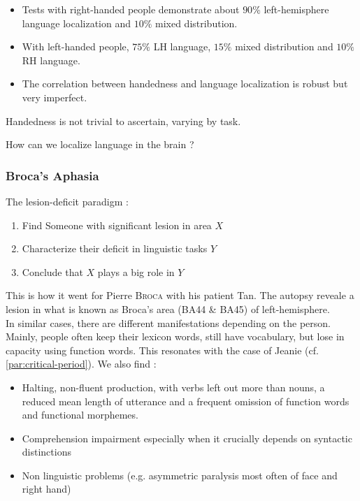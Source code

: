 \documentclass{cours}
\begin{document}
\begin{itemize}
    \item Tests with right-handed people demonstrate about $90\%$ left-hemisphere language localization and $10\%$ mixed distribution.
    \item With left-handed people, $75\%$ LH language, $15\%$ mixed distribution and $10\%$ RH language.
    \item The correlation between handedness and language localization is robust but very imperfect.
\end{itemize}
Handedness is not trivial to ascertain, varying by task.

How can we localize language in the brain ?

\subsubsection{Broca's Aphasia}
The lesion-deficit paradigm :
\begin{enumerate}
    \item Find Someone with significant lesion in area $X$
    \item Characterize their deficit in linguistic tasks $Y$
    \item Conclude that $X$ plays a big role in $Y$
\end{enumerate}
This is how it went for Pierre \textsc{Broca} with his patient Tan. The autopsy reveale a lesion in what is known as Broca's area (BA44 \& BA45) of left-hemisphere.\\
In similar cases, there are different manifestations depending on the person. Mainly, people often keep their lexicon words, still have vocabulary, but lose in capacity using function words. This resonates with the case of Jeanie (cf. \ref{par:critical-period}). We also find :
\begin{itemize}
    \item Halting, non-fluent production, with verbs left out more than nouns, a reduced mean length of utterance and a frequent omission of function words and functional morphemes.
    \item Comprehension impairment especially when it crucially depends on syntactic distinctions
    \item Non linguistic problems (e.g. asymmetric paralysis most often of face and right hand)
\end{itemize}
\end{document}
